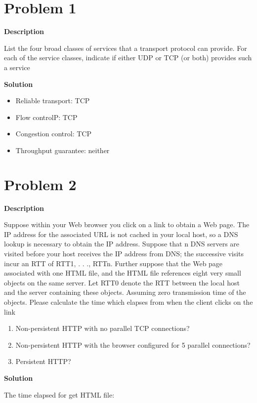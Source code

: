 \documentclass[12pt,letterpaper]{ctexart}
\begin{document}
\section*{Problem 1}

{\bf Description}

List the four broad classes of services that a transport protocol can provide. For each of the service classes, indicate if either UDP or TCP (or both) provides such a service

{\bf Solution}

\begin{itemize}
  \item Reliable transport: TCP
  \item Flow controlP: TCP
  \item Congestion control: TCP
  \item Throughput guarantee: neither
\end{itemize}

\newpage

\section*{Problem 2}

{\bf Description}

Suppose within your Web browser you click on a link to obtain a Web page. The IP address for the associated URL is not cached in your local host, so a DNS lookup is necessary to obtain the IP address. Suppose that n DNS servers are visited before your host receives the IP address from DNS; the successive visits incur an RTT of RTT1, . . ., RTTn. Further suppose that the Web page associated with one HTML file, and the HTML file references eight very small objects on the same server. Let RTT0 denote the RTT between the local host and the server containing these objects. Assuming zero transmission time of the objects. Please calculate the time which elapses from when the client clicks on the link

\begin{enumerate}
  \item Non-persistent HTTP with no parallel TCP connections?
  \item Non-persistent HTTP with the browser configured for 5 parallel connections?
  \item Persistent HTTP?
\end{enumerate}


{\bf Solution}

The time elapsed for get HTML file:
\end{document}

